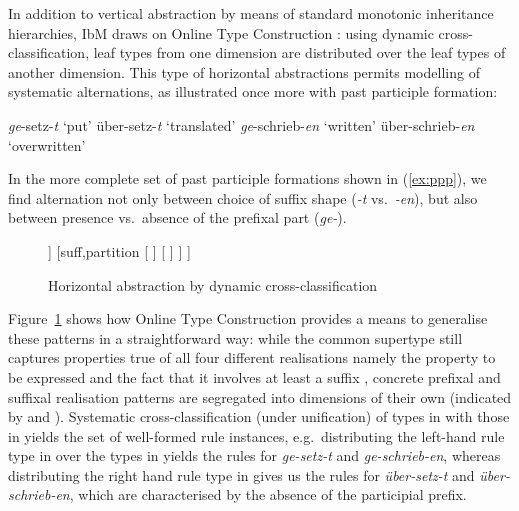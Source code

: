 \documentclass[output=paper
 	        ,biblatex
                ,babelshorthands
                ,newtxmath
                ,draftmode
                ,colorlinks, citecolor=brown
]{langscibook}
\begin{document}
\begin{exe}
\begin{xlist}
\begin{exe}
\begin{xlist}
In addition to vertical abstraction by means of standard monotonic
inheritance hierarchies, IbM draws on Online Type Construction
\citep{Koenig94}: using dynamic cross-classification, leaf types from
one dimension are distributed over the leaf types of another
dimension. This type of horizontal abstractions permits modelling of
systematic alternations, as illustrated once more with  past
participle formation:

\begin{exe}
  \ex \label{ex:ppp}
  \begin{xlist}

    \ex \textit{ge}-setz-\textit{t} `put'
    \ex über-setz-\textit{t} `translated'
    \ex \textit{ge}-schrieb-\textit{en} `written'
    \ex über-schrieb-\textit{en} `overwritten'
  \end{xlist}
\end{exe}

In the more complete set of past participle formations shown in
(\ref{ex:ppp}), we find alternation not only between choice of suffix
shape (\textit{-t} vs.\ \textit{-en}), but also between presence
vs.\ absence of the prefixal part (\textit{ge-}).

\begin{figure}
  \centering
  \footnotesize
\begin{forest}
[%
\avm{
	[mud &	\{[tam & ppp]\} \\
	mph & < \ldots\  [pc & 1] > ]
}
	[pref,partition
		[%
		\avm{
			[mph & <[ph & ge \\
					pc & -1], ![ ]!> ]
		}
		]
		[%
		\avm{
			[mph & <![ ]!> ]
		}
		]
	]
	[suff,partition
		[%
		]
		[%
		]
	]
]
\end{forest}
  \caption{Horizontal abstraction by dynamic cross-classification}\label{fig:Horizontal}
\end{figure}

Figure~\ref{fig:Horizontal} shows how Online Type Construction provides
a means to generalise these patterns in a straightforward way: while the
common supertype still captures properties true of all four different
realisations \emdash namely the property to be expressed and the fact that it
involves at least a suffix \emdash, concrete prefixal and suffixal realisation
patterns are segregated into dimensions of their own (indicated by
 and ). Systematic cross-classification
(under unification) of types in  with those in
 yields the set of well-formed rule instances,
e.g.\ distributing the left-hand rule type in  over the
types in  yields the rules for \textit{ge-setz-t} and
\textit{ge-schrieb-en}, whereas distributing the right hand rule type
in  gives us the rules for \textit{über-setz-t} and
\textit{über-schrieb-en}, which are characterised by the absence of
the participial prefix.


\end{xlist}
\end{exe}
\end{xlist}
\end{exe}
\end{document}
